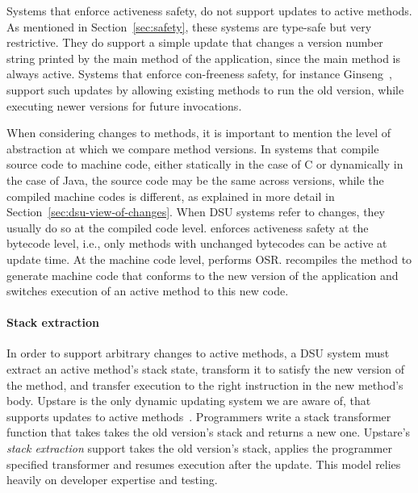 Systems that enforce activeness safety, do not support updates to active
methods. As mentioned in Section~\ref{sec:safety}, these systems are
type-safe but very restrictive. They do support a simple
update that changes a version number string printed by the main method of
the application, since the main method is always active. Systems that
enforce con-freeness safety, for instance Ginseng~\cite{neamtiu06dsu}, support
such updates by allowing existing methods to run the old version, while
executing newer versions for future invocations.

When considering changes to methods, it is important to mention the level
of abstraction at which we compare method versions. In systems that compile
source code to machine code, either statically in the case of C or
dynamically in the case of Java, the source code may be the same across
versions, while the compiled machine codes is different, as explained in
more detail in
Section~\ref{sec:dsu-view-of-changes}. When DSU systems refer to changes,
they usually do so at the compiled code level. \JV enforces activeness
safety at the bytecode level, i.e., only methods with unchanged bytecodes
can be active at update time. At the machine code level, \JV performs
\acl{OSR}.
\JV recompiles the method to generate machine code that conforms to the new
version of the application and switches execution of an active method to
this new code.

\paragraph{Stack extraction} In order to support arbitrary changes to
active methods, a DSU system must extract an active method's stack state,
transform it to satisfy the new version of the method, and transfer
execution to the right instruction in the new method's body.
Upstare is the only dynamic updating system we are aware of, that supports
updates to active methods~\cite{upstare}. Programmers write a stack transformer function that takes takes
the old version's stack and returns a new one. Upstare's \emph{stack
extraction} support takes the old version's stack, applies the programmer
specified transformer and resumes execution after the update.  This model
relies heavily on developer expertise and testing.


